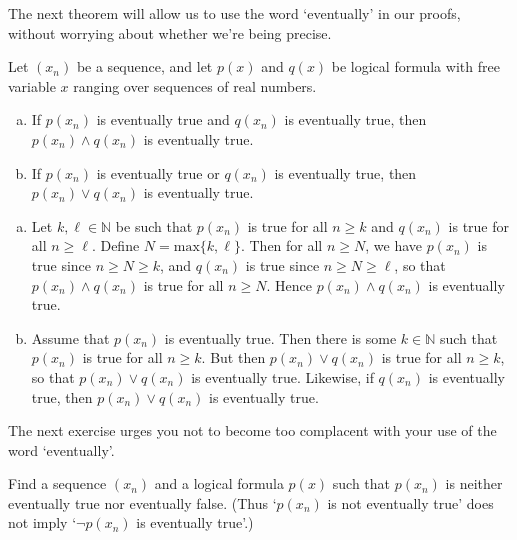 The next theorem will allow us to use the word `eventually' in our proofs, without worrying about whether we're being precise.

\begin{theorem}
Let $(x_n)$ be a sequence, and let $p(x)$ and $q(x)$ be logical formula with free variable $x$ ranging over sequences of real numbers.
\begin{enumerate}[(a)]
\item If $p(x_n)$ is eventually true and $q(x_n)$ is eventually true, then $p(x_n) \wedge q(x_n)$ is eventually true.
\item If $p(x_n)$ is eventually true or $q(x_n)$ is eventually true, then $p(x_n) \vee q(x_n)$ is eventually true.
\end{enumerate}
\end{theorem}

\begin{cproof}
\fixlistskip
\begin{enumerate}[(a)]
\item Let $k,\ell \in \mathbb{N}$ be such that $p(x_n)$ is true for all $n \ge k$ and $q(x_n)$ is true for all $n \ge \ell$. Define $N = \mathrm{max} \{ k, \ell \}$. Then for all $n \ge N$, we have $p(x_n)$ is true since $n \ge N \ge k$, and $q(x_n)$ is true since $n \ge N \ge \ell$, so that $p(x_n) \wedge q(x_n)$ is true for all $n \ge N$. Hence $p(x_n) \wedge q(x_n)$ is eventually true.

\item Assume that $p(x_n)$ is eventually true. Then there is some $k \in \mathbb{N}$ such that $p(x_n)$ is true for all $n \ge k$. But then $p(x_n) \vee q(x_n)$ is true for all $n \ge k$, so that $p(x_n) \vee q(x_n)$ is eventually true. Likewise, if $q(x_n)$ is eventually true, then $p(x_n) \vee q(x_n)$ is eventually true.
\end{enumerate}
\end{cproof}

The next exercise urges you not to become too complacent with your use of the word `eventually'.

\begin{exercise}
Find a sequence $(x_n)$ and a logical formula $p(x)$ such that $p(x_n)$ is neither eventually true nor eventually false. (Thus `$p(x_n)$ is not eventually true' does not imply `$\neg p(x_n)$ is eventually true'.)
\end{exercise}

